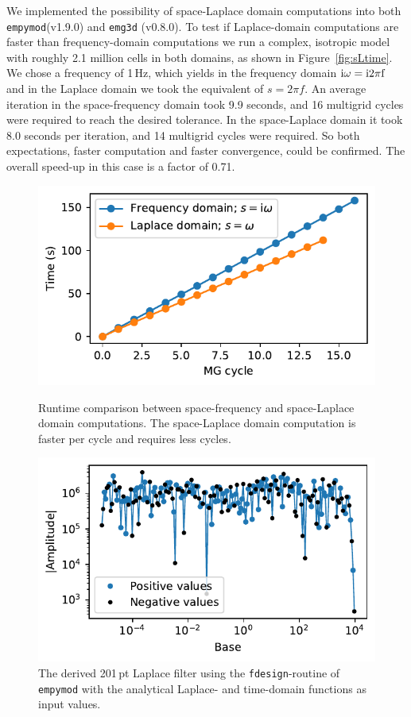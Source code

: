 \documentclass{eage2020}
\newcommand{\emg}[2]{\texttt{emg#1#2}\xspace}
\newcommand{\empymod}{\texttt{empymod}\xspace}
\begin{document}
We implemented the possibility of space-Laplace domain computations into both
\empymod (v1.9.0) and \emg3d (v0.8.0). To test if Laplace-domain computations
are faster than frequency-domain computations we run a complex, isotropic model
with roughly 2.1 million cells in both domains, as shown in
Figure~\ref{fig:sLtime}. We chose a frequency of 1\,Hz, which yields in the
frequency domain $\rm{i}\omega=\rm{i}2\pi f$ and in the Laplace domain we took
the equivalent of $s=2\pi f$. An average iteration in the space-frequency
domain took 9.9 seconds, and 16 multigrid cycles were required to reach the
desired tolerance. In the space-Laplace domain it took 8.0 seconds per
iteration, and 14 multigrid cycles were required. So both expectations, faster
computation and faster convergence, could be confirmed. The overall speed-up in
this case is a factor of 0.71.
%
\begin{figure}[b]%
  \centering
  \parbox{.48\linewidth}{
    \includegraphics[width=\linewidth]{xf-vs-xs}%
    \caption{Runtime comparison between space-frequency and space-Laplace
      domain computations. The space-Laplace domain computation is faster per
      cycle and requires less cycles.}
    \label{fig:sLtime}
  }
  \hfill
  \begin{minipage}{.48\linewidth}%
    \includegraphics[width=\linewidth]{filter-space}%
    \caption{The derived 201\,pt Laplace filter using the
      \texttt{fdesign}-routine of \empymod with the analytical Laplace- and
      time-domain functions as input values.}
    \label{fig:LaplaceDLF}
  \end{minipage}
\end{figure}
%
\end{document}
